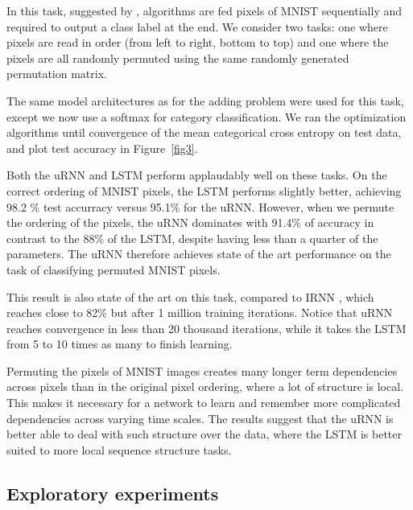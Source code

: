 \documentclass{article} %
\begin{document}
In this task, suggested by \cite{Quoc2015}, algorithms are fed pixels of MNIST \citep{MNIST} sequentially and required to output a 
class label at the end. We consider two tasks: one where pixels are read in order (from left to right,
bottom to top) and one where the pixels are all randomly permuted using the same randomly generated
permutation matrix.

The same model architectures as for the adding problem were used for this task, except we now use a 
softmax for category classification. We ran the optimization algorithms until convergence of the 
mean categorical cross entropy on test data, and plot test accuracy in Figure~\ref{fig3}.

Both the uRNN and LSTM perform applaudably well on these tasks.
On the correct ordering of MNIST pixels, the LSTM performs slightly better, achieving 98.2 \% 
test accurracy versus 95.1\% for the uRNN. 
However, when we permute the ordering of the pixels, the uRNN dominates with 91.4\% of accuracy in 
contrast to the 88\% of the LSTM, despite having less than a quarter of the parameters. 
The uRNN therefore achieves state of the art performance on the task of classifying permuted MNIST pixels.

This result is also state of the art on this task, compared to IRNN \citep{Quoc2015}, which reaches 
close to 82\% but after 1 million training iterations. Notice that uRNN reaches convergence in less 
than 20 thousand iterations, while it takes the LSTM from 5 to 10 times as many to finish learning.

Permuting the pixels of MNIST images creates many longer term dependencies across pixels than in the 
original pixel ordering, where a lot of structure is local. This makes it necessary for a network to 
learn and remember more complicated dependencies across varying time scales. 
The results suggest that the uRNN is better able to deal with such structure over the data, where the 
LSTM is better suited to more local sequence structure tasks.  


\subsection{Exploratory experiments}
\end{document}
